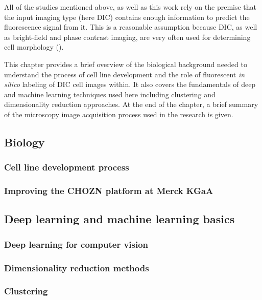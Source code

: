 All of the studies mentioned above, as well as this work rely on the premise that the input imaging type (here DIC) contains enough information to predict the fluorescence signal from it. This is a reasonable assumption because DIC, as well as bright-field and phase contrast imaging, are very often used for determining cell morphology (\cite{Kasprowicz_2017}).

This chapter provides a brief overview of the biological background needed to understand the process of cell line development and the role of fluorescent \textit{in silico} labeling of DIC cell images within. It also covers the fundamentals of deep and machine learning techniques used here including clustering and dimensionality reduction approaches. At the end of the chapter, a brief summary of the microscopy image acquisition process used in the research is given.

    \subsection{Biology}
        \subsubsection{Cell line development process}
        
        \subsubsection{Improving the CHOZN\raisebox{1ex}{\small{\textregistered}} platform at Merck KGaA}
        
    \subsection{Deep learning and machine learning basics}\label{subsection:dl}
        \subsubsection{Deep learning for computer vision}
            
        \subsubsection{Dimensionality reduction methods}
            
        \subsubsection{Clustering}
            
